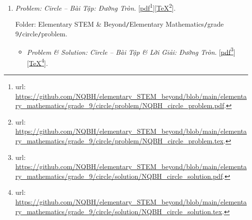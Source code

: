 \documentclass[12pt,oneside]{book}
\begin{document}
\begin{enumerate}
	\begin{itemize}
		\item {\it Problem \& Solution: Trigonometry in Triangles -- Bài Tập \& Lời Giải: Hệ Thức Lượng Trong Tam Giác $\sin\alpha,\cos\alpha,\tan\alpha,\cot\alpha$}. [\href{https://github.com/NQBH/elementary_STEM_beyond/blob/main/elementary_mathematics/grade_9/trigonometry/solution/NQBH_trigonometry_solution.pdf}{pdf}\footnote{{\sc url}: \url{https://github.com/NQBH/elementary_STEM_beyond/blob/main/elementary_mathematics/grade_9/trigonometry/solution/NQBH_trigonometry_solution.pdf}.}][\href{https://github.com/NQBH/elementary_STEM_beyond/blob/main/elementary_mathematics/grade_9/trigonometry/solution/NQBH_trigonometry_solution.tex}{\TeX}\footnote{{\sc url}: \url{https://github.com/NQBH/elementary_STEM_beyond/blob/main/elementary_mathematics/grade_9/trigonometry/solution/NQBH_trigonometry_solution.tex}.}].
		
		Folder: {\sf Elementary STEM \& Beyond{\tt/}Elementary Mathematics{\tt/}grade 9{\tt/}trigonometry triangle{\tt/}solution}.
	\end{itemize}
	\item {\it Problem: Circle -- Bài Tập: Đường Tròn}. [\href{https://github.com/NQBH/elementary_STEM_beyond/blob/main/elementary_mathematics/grade_9/circle/problem/NQBH_circle_problem.pdf}{pdf}\footnote{{\sc url}: \url{https://github.com/NQBH/elementary_STEM_beyond/blob/main/elementary_mathematics/grade_9/circle/problem/NQBH_circle_problem.pdf}.}][\href{https://github.com/NQBH/elementary_STEM_beyond/blob/main/elementary_mathematics/grade_9/circle/problem/NQBH_circle_problem.tex}{\TeX}\footnote{{\sc url}: \url{https://github.com/NQBH/elementary_STEM_beyond/blob/main/elementary_mathematics/grade_9/circle/problem/NQBH_circle_problem.tex}.}].
	
	Folder: {\sf Elementary STEM \& Beyond{\tt/}Elementary Mathematics{\tt/}grade 9{\tt/}circle{\tt/}problem}.
	\begin{itemize}
		\item {\it Problem \& Solution: Circle -- Bài Tập \& Lời Giải: Đường Tròn}. [\href{https://github.com/NQBH/elementary_STEM_beyond/blob/main/elementary_mathematics/grade_9/circle/solution/NQBH_circle_solution.pdf}{pdf}\footnote{{\sc url}: \url{https://github.com/NQBH/elementary_STEM_beyond/blob/main/elementary_mathematics/grade_9/circle/solution/NQBH_circle_solution.pdf}.}][\href{https://github.com/NQBH/elementary_STEM_beyond/blob/main/elementary_mathematics/grade_9/circle/solution/NQBH_circle_solution.tex}{\TeX}\footnote{{\sc url}: \url{https://github.com/NQBH/elementary_STEM_beyond/blob/main/elementary_mathematics/grade_9/circle/solution/NQBH_circle_solution.tex}.}].
		

\end{itemize}
\end{enumerate}
\end{document}
